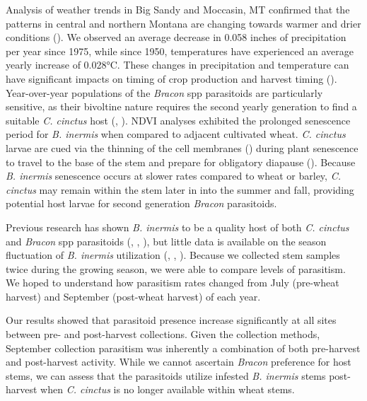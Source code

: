 \documentclass[
]{article}
\begin{document}
Analysis of weather trends in Big Sandy and Moccasin, MT confirmed that
the patterns in central and northern Montana are changing towards warmer
and drier conditions (). We observed an average decrease in 0.058 inches of precipitation
per year since 1975, while since 1950, temperatures have experienced an
average yearly increase of 0.028°C. These changes in precipitation and
temperature can have significant impacts on timing of crop production
and harvest timing ().
Year-over-year populations of the \emph{Bracon} spp parasitoids are
particularly sensitive, as their bivoltine nature requires the second
yearly generation to find a suitable \emph{C. cinctus} host
(,
). NDVI analyses exhibited
the prolonged senescence period for \emph{B. inermis} when compared to
adjacent cultivated wheat. \emph{C. cinctus} larvae are cued via the
thinning of the cell membranes () during plant senescence to travel to the base of the stem
and prepare for obligatory diapause (). Because \emph{B. inermis} senescence occurs at slower rates
compared to wheat or barley, \emph{C. cinctus} may remain within the
stem later in into the summer and fall, providing potential host larvae
for second generation \emph{Bracon} parasitoids.

Previous research has shown \emph{B. inermis} to be a quality host of
both \emph{C. cinctus} and \emph{Bracon} spp parasitoids
(,
,
), but little data is available
on the season fluctuation of \emph{B. inermis} utilization
(,
,
). Because we collected stem
samples twice during the growing season, we were able to compare levels
of parasitism. We hoped to understand how parasitism rates changed from
July (pre-wheat harvest) and September (post-wheat harvest) of each
year.

Our results showed that parasitoid presence increase significantly at
all sites between pre- and post-harvest collections. Given the
collection methods, September collection parasitism was inherently a
combination of both pre-harvest and post-harvest activity. While we
cannot ascertain \emph{Bracon} preference for host stems, we can assess
that the parasitoids utilize infested \emph{B. inermis} stems
post-harvest when \emph{C. cinctus} is no longer available within wheat
stems.
\end{document}
